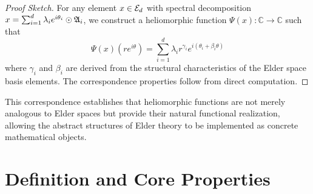 \begin{proof}[Proof Sketch]
For any element $x \in \mathcal{E}_{d}$ with spectral decomposition $x = \sum_{i=1}^{d} \lambda_i e^{i\theta_i} \odot \mathfrak{A}_{i}$, we construct a heliomorphic function $\Psi(x): \mathbb{C} \rightarrow \mathbb{C}$ such that
\begin{equation}
\Psi(x)(re^{i\theta}) = \sum_{i=1}^{d} \lambda_i r^{\gamma_i} e^{i(\theta_i + \beta_i \theta)}
\end{equation}
where $\gamma_i$ and $\beta_i$ are derived from the structural characteristics of the Elder space basis elements. The correspondence properties follow from direct computation.
\end{proof}

This correspondence establishes that heliomorphic functions are not merely analogous to Elder spaces but provide their natural functional realization, allowing the abstract structures of Elder theory to be implemented as concrete mathematical objects.

\section{Definition and Core Properties}

